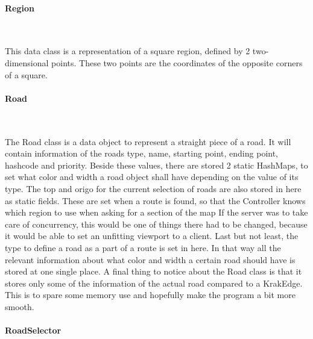 \documentclass[a4paper,10pt,titlepage]{article}
\begin{document}
				\paragraph{Region}\mbox{}\
				
This data class is a representation of a square region, defined by 2 two-dimensional points. These two points are the coordinates of the opposite corners of a square.
				
				\paragraph{Road}\mbox{}\
				
The Road class is a data object to represent a straight piece of a road. It will contain information of the roads type, name, starting point, ending point, hashcode and priority. Beside these values, there are stored 2 static HashMaps, to set what color and width a road object shall have depending on the value of its type. 
The top and origo for the current selection of roads are also stored in here as static fields. These are set when a route is found, so that the Controller knows which region to use when asking for a section of the map
If the server was to take care of concurrency, this would be one of things there had to be changed, because it would be able to set an unfitting viewport to a client.
Last but not least, the type to define a road as a part of a route is set in here. In that way all the relevant information about what color and width a certain road should have is stored at one single place.
A final thing to notice about the Road class is that it stores only some of the information of the actual road compared to a KrakEdge. This is to spare some memory use and hopefully make the program a bit more smooth.

				
				\paragraph{RoadSelector}\mbox{}\
				
\end{document}
